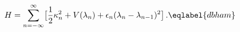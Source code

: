 \begin{equation}
H = \sum_{n=-\infty}^{\infty} \bigl[ \frac 12\kappa_n^2 + V(\lambda_n) + 
\epsilon_n (\lambda_n-\lambda_{n-1})^2 \bigr]\,.
\eqlabel{dbham}
\end{equation}

